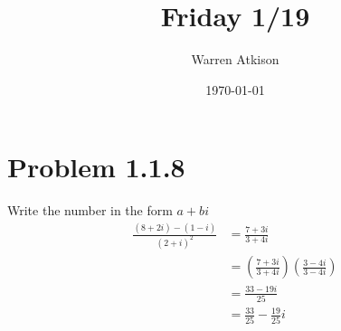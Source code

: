 \documentclass{article}
\title{Friday 1/19}
\author{Warren Atkison}
\date{\today}
\begin{document}
\maketitle

\section*{Problem 1.1.8}
Write the number in the form $a + bi$
\begin{align*}
	\frac{(8 + 2i) - (1 - i)}{(2 + i)^2} &= \frac{7 + 3i}{3 + 4i} \\
					     &= \left(\frac{7 + 3i}{3 + 4i}\right)\left(\frac{3 - 4i}{3 - 4i}\right) \\ 
					     &= \frac{33 - 19i}{25} \\
					     &= \frac{33}{25} - \frac{19}{25}i
\end{align*}
\end{document}
